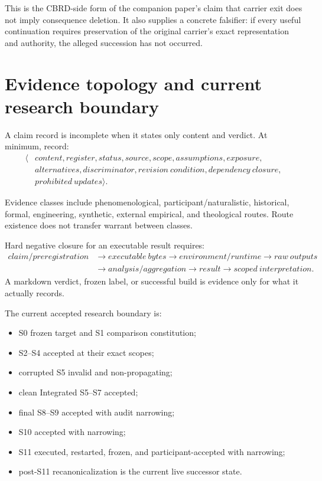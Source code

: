 This is the CBRD-side form of the companion paper's claim that carrier exit does not imply consequence deletion. It also supplies a concrete falsifier: if every useful continuation requires preservation of the original carrier's exact representation and authority, the alleged succession has not occurred.

\section{Evidence topology and current research boundary}
\label{sec:evidence-current}

A claim record is incomplete when it states only content and verdict. At minimum, record:
\begin{equation}
\begin{aligned}
\langle &content,register,status,source,scope,assumptions,exposure,\\
&alternatives,discriminator,revision\ condition,dependency\ closure,\\
&prohibited\ updates\rangle.
\end{aligned}
\end{equation}

Evidence classes include phenomenological, participant/naturalistic, historical, formal, engineering, synthetic, external empirical, and theological routes. Route existence does not transfer warrant between classes.

Hard negative closure for an executable result requires:
\begin{equation}
\begin{aligned}
claim/preregistration
&\rightarrow executable\ bytes
\rightarrow environment/runtime
\rightarrow raw\ outputs\\
&\rightarrow analysis/aggregation
\rightarrow result
\rightarrow scoped\ interpretation.
\end{aligned}
\label{eq:negative-proof-chain}
\end{equation}
A markdown verdict, frozen label, or successful build is evidence only for what it actually records.

The current accepted research boundary is:
\begin{itemize}
\item S0 frozen target and S1 comparison constitution;
\item S2--S4 accepted at their exact scopes;
\item corrupted S5 invalid and non-propagating;
\item clean Integrated S5--S7 accepted;
\item final S8--S9 accepted with audit narrowing;
\item S10 accepted with narrowing;
\item S11 executed, restarted, frozen, and participant-accepted with narrowing;
\item post-S11 recanonicalization is the current live successor state.
\end{itemize}

